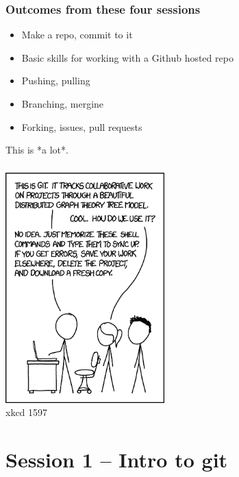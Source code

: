 \documentclass[14pt,aspectratio=1610]{beamer} %
\newcommand{\fframe}[2]{
   \begin{frame}
\frametitle{#1}
#2
\end{frame}
}
\begin{document}
           
\fframe{Outcomes from these four sessions}
{
	\begin{itemize}
		\item Make a repo, commit to it
		\item Basic skills for working with a Github hosted repo
		\item Pushing, pulling
		\item Branching, mergine
		\item Forking, issues, pull requests
	\end{itemize}

	\vspace{\baselineskip}

	This is *a lot*.  
}                                  

\fframe{}
{
	\begin{center}
\includegraphics[height=3.5in]{diagrams/git_2x.png}\\xkcd 1597
	\end{center}
}

\section{Session 1 -- Intro to git}
\end{document}
